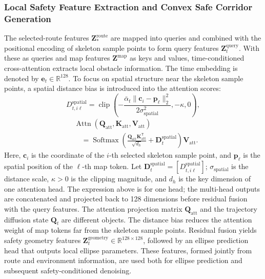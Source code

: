 \documentclass[journal]{IEEEtran}
\begin{document}
\subsubsection{Local Safety Feature Extraction and Convex Safe Corridor Generation}
The selected-route features $\mathbf Z_\ast^{\mathrm{route}}$ are mapped into
queries and combined with the positional encoding of skeleton sample points to
form query features $\mathbf Z_t^{\mathrm{query}}$. With these as queries and
map features $\mathbf Z^{\mathrm{map}}$ as keys and values, time-conditioned
cross-attention extracts local obstacle information. The time embedding is
denoted by $\mathbf e_t\in\mathbb R^{128}$. To focus on spatial structure near
the skeleton sample points, a spatial distance bias is introduced into the
attention scores:
\begin{equation}
D_{t,i\ell}^{\mathrm{spatial}}=\operatorname{clip}\left(
-\frac{\bar\alpha_t\lVert\mathbf c_i-\mathbf p_\ell\rVert_2^2}
{2\sigma_{\mathrm{spatial}}^2},-\kappa,0\right),
\end{equation}
\begin{equation}
\begin{aligned}
&\operatorname{Attn}(\mathbf Q_{\mathrm{att}},\mathbf K_{\mathrm{att}},\mathbf V_{\mathrm{att}})\\
&\quad=\operatorname{Softmax}\left(
\frac{\mathbf Q_{\mathrm{att}}\mathbf K_{\mathrm{att}}^{\mathsf T}}{\sqrt{d_h}}
+\mathbf D_t^{\mathrm{spatial}}\right)\mathbf V_{\mathrm{att}}.
\end{aligned}
\end{equation}
Here, $\mathbf c_i$ is the coordinate of the $i$-th selected skeleton sample
point, and $\mathbf p_\ell$ is the spatial position of the $\ell$-th map token.
Let $\mathbf D_t^{\mathrm{spatial}}=[D_{t,i\ell}^{\mathrm{spatial}}]$;
$\sigma_{\mathrm{spatial}}$ is the distance scale, $\kappa>0$ is the clipping
magnitude, and $d_h$ is the key dimension of one attention head. The expression
above is for one head; the multi-head outputs are concatenated and projected
back to 128 dimensions before residual fusion with the query features.
The attention projection matrix $\mathbf Q_{\mathrm{att}}$ and the trajectory
diffusion state $\mathbf Q_t$ are different objects. The distance bias reduces
the attention weight of map tokens far from the skeleton sample points.
Residual fusion yields safety geometry features
$\mathbf Z_t^{\mathrm{geometry}}\in\mathbb R^{128\times128}$, followed by an
ellipse prediction head that outputs local ellipse parameters. These features,
formed jointly from route and environment information, are used both for
ellipse prediction and subsequent safety-conditioned denoising.
\end{document}
